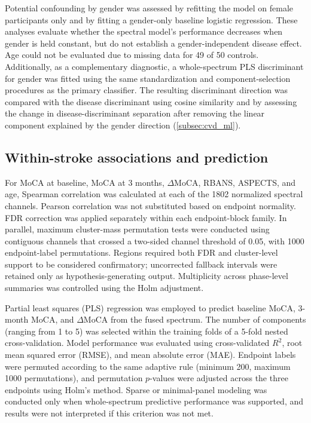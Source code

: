 \documentclass[preprint,12pt]{elsarticle}
\begin{document}
Potential confounding by gender was assessed by refitting the model on female participants only and by fitting a gender-only baseline logistic regression. These analyses evaluate whether the spectral model's performance decreases when gender is held constant, but do not establish a gender-independent disease effect. Age could not be evaluated due to missing data for 49 of 50 controls. Additionally, as a complementary diagnostic, a whole-spectrum PLS discriminant for gender was fitted using the same standardization and component-selection procedures as the primary classifier. The resulting discriminant direction was compared with the disease discriminant using cosine similarity and by assessing the change in disease-discriminant separation after removing the linear component explained by the gender direction (\cref{subsec:cvd_ml}).

\subsection{Within-stroke associations and prediction} \label{subsec:clinical_methods}

For MoCA at baseline, MoCA at 3 months, $\Delta$MoCA, RBANS, ASPECTS, and age, Spearman correlation was calculated at each of the 1802 normalized spectral channels. Pearson correlation was not substituted based on endpoint normality. FDR correction was applied separately within each endpoint-block family. In parallel, maximum cluster-mass permutation tests were conducted using contiguous channels that crossed a two-sided channel threshold of 0.05, with 1000 endpoint-label permutations. Regions required both FDR and cluster-level support to be considered confirmatory; uncorrected fallback intervals were retained only as hypothesis-generating output. Multiplicity across phase-level summaries was controlled using the Holm adjustment.

Partial least squares (PLS) regression was employed to predict baseline MoCA, 3-month MoCA, and $\Delta$MoCA from the fused spectrum. The number of components (ranging from 1 to 5) was selected within the training folds of a 5-fold nested cross-validation. Model performance was evaluated using cross-validated $R^2$, root mean squared error (RMSE), and mean absolute error (MAE). Endpoint labels were permuted according to the same adaptive rule (minimum 200, maximum 1000 permutations), and permutation $p$-values were adjusted across the three endpoints using Holm's method. Sparse or minimal-panel modeling was conducted only when whole-spectrum predictive performance was supported, and results were not interpreted if this criterion was not met.
\end{document}
